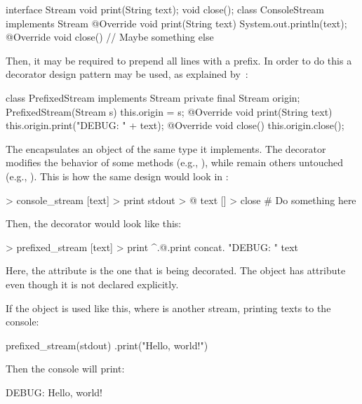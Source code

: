 \begin{ffcode}
interface Stream {
  void print(String text);
  void close();
}
class ConsoleStream implements Stream {
  @Override
  void print(String text) {
    System.out.println(text);
  }
  @Override
  void close() {
    // Maybe something else
  }
}
\end{ffcode}

Then, it may be required to prepend all lines with a prefix. In order
to do this a decorator design pattern may be used,
as explained by~\citet[p.196]{gamma1994design}:

\begin{ffcode}
class PrefixedStream implements Stream {
  private final Stream origin;
  PrefixedStream(Stream s) {
    this.origin = s;
  }
  @Override
  void print(String text) {
    this.origin.print("DEBUG: " + text);
  }
  @Override
  void close() {
    this.origin.close();
  }
}
\end{ffcode}

The  encapsulates an object of the same type it
implements. The decorator modifies the behavior of some methods (e.g., ), while
remain others untouched (e.g., ). This is how the same design
would look in \eo{}:

\begin{ffcode}
[] > console_stream
  [text] > print
    stdout > @
      text
  [] > close
    # Do something here
\end{ffcode}

Then, the decorator would look like this:

\begin{ffcode}
[@] > prefixed_stream
  [text] > print
    ^.@.print
      concat.
        "DEBUG: "
        text
\end{ffcode}

Here, the  attribute is the one that is being decorated.
The object  has attribute  even
though it is not declared explicitly.

If the object is used like this, where  is another stream,
printing texts to the console:

\begin{ffcode}
prefixed_stream(stdout)
  .print("Hello, world!")
\end{ffcode}

Then the console will print:

\begin{ffcode}
DEBUG: Hello, world!
\end{ffcode}

